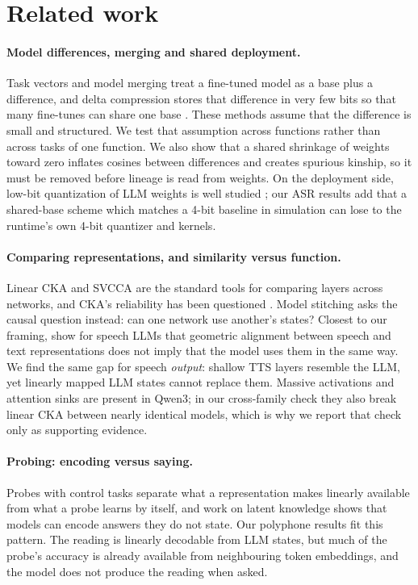 \documentclass[11pt]{article}
\begin{document}
\section{Related work}
\label{sec:related}
\paragraph{Model differences, merging and shared deployment.} Task vectors \citep{ilharco2023task} and model merging \citep{yadav2023ties,yu2024dare} treat a fine-tuned model as a base plus a difference, and delta compression stores that difference in very few bits so that many fine-tunes can share one base \citep{liu2024bitdelta}. These methods assume that the difference is small and structured. We test that assumption across functions rather than across tasks of one function. We also show that a shared shrinkage of weights toward zero inflates cosines between differences and creates spurious kinship, so it must be removed before lineage is read from weights. On the deployment side, low-bit quantization of LLM weights is well studied \citep{dettmers2022int8}; our ASR results add that a shared-base scheme which matches a 4-bit baseline in simulation can lose to the runtime's own 4-bit quantizer and kernels.

\paragraph{Comparing representations, and similarity versus function.} Linear CKA \citep{kornblith2019cka} and SVCCA \citep{raghu2017svcca} are the standard tools for comparing layers across networks, and CKA's reliability has been questioned \citep{davari2023cka}. Model stitching \citep{lenc2015equivariance,bansal2021stitching} asks the causal question instead: can one network use another's states? Closest to our framing, \citet{hsu2026geometric} show for speech LLMs that geometric alignment between speech and text representations does not imply that the model uses them in the same way. We find the same gap for speech \emph{output}: shallow TTS layers resemble the LLM, yet linearly mapped LLM states cannot replace them. Massive activations and attention sinks \citep{sun2024massive,xiao2024sinks} are present in Qwen3; in our cross-family check they also break linear CKA between nearly identical models, which is why we report that check only as supporting evidence.

\paragraph{Probing: encoding versus saying.} Probes with control tasks \citep{hewitt2019control} separate what a representation makes linearly available from what a probe learns by itself, and work on latent knowledge \citep{burns2023latent} shows that models can encode answers they do not state. Our polyphone results fit this pattern. The reading is linearly decodable from LLM states, but much of the probe's accuracy is already available from neighbouring token embeddings, and the model does not produce the reading when asked.
\end{document}
